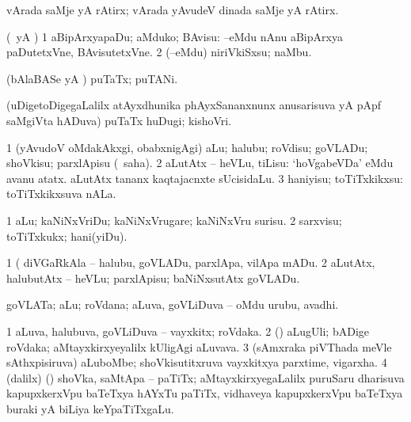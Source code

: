 \bentry
{} 
\gl{\nA}
\expl{}
\bmng
vArada saMje yA rAtirx; vArada yAvudeV dinada saMje yA rAtirx. 
\emng
\eentry

\bentry
{} 
\gl{\akirx}
\expl{}
\bmng
(\pArxparx\ yA \kAparx) 
\bnum
\num{1} aBipArxyapaDu; aMduko; BAvisu:  --eMdu nAnu aBipArxya paDutetxVne, BAvisutetxVne. 
\num{2} (--eMdu) niriVkiSxsu; naMbu. 
\enum
\emng
\eentry

\bentry
{} 
\gl{\gu}
\bmng
(bAlaBASe yA \AmA) puTaTx; puTANi. 
\emng
\eentry

\bentry
{} 
\gl{\nA}
\expl{}
\bmng
(uDigetoDigegaLalilx atAyxdhunika phAyxSananxnunx anusarisuva yA pApf saMgiVta hADuva) puTaTx huDugi; kishoVri. 
\emng
\eentry

\bentry
{} 
\gl{\sakirx}
\expl{}
\bmng
\bnum
\num{1} (yAvudoV oMdakAkxgi, obabxnigAgi) aLu; halubu; roVdisu; goVLADu; shoVkisu; parxlApisu (\akirx\ saha). 
\num{2} aLutAtx -- heVLu, tiLisu:  `hoVgabeVDa' eMdu avanu atatx.  aLutAtx tananx kaqtajacnxte sUcisidaLu. 
\num{3} haniyisu; toTiTxkikxsu:  toTiTxkikxsuva nALa. 
\enum
\emng

\noindent 
\gl{\akirx}
\expl{}
\bmng
\bnum
\num{1} aLu; kaNiNxVriDu; kaNiNxVrugare; kaNiNxVru surisu. 
\num{2} sarxvisu; toTiTxkukx; hani(yiDu). 
\enum
\emng

\noindent 
\gl{\pagu}
\expl{}
\bmng
\bnum
\num{1}  (  diVGaRkAla -- halubu, goVLADu, parxlApa, vilApa mADu. 
\num{2}  aLutAtx, halubutAtx -- heVLu; parxlApisu; baNiNxsutAtx goVLADu. 
\enum
\emng
\eentry

\bentry
{} 
\gl{\nA}
\expl{}
\bmng
goVLATa; aLu; roVdana; aLuva, goVLiDuva -- oMdu urubu, avadhi. 
\emng
\eentry

\bentry
{} 
\gl{\nA}
\expl{}
\bmng
\bnum
\num{1} aLuva, halubuva, goVLiDuva -- vayxkitx; roVdaka. 
\num{2} (\ca) aLugUli; bADige roVdaka; aMtayxkirxyeyalilx kUligAgi aLuvava. 
\num{3} (sAmxraka piVThada meVle sAthxpisiruva) aLuboMbe; shoVkisutitxruva vayxkitxya parxtime, vigarxha. 
\num{4} (\bava dalilx) (\ca) shoVka, saMtApa -- paTiTx; aMtayxkirxyegaLalilx puruSaru dharisuva kapupxkerxVpu baTeTxya hAYxTu paTiTx, vidhaveya kapupxkerxVpu baTeTxya buraki yA biLiya keYpaTiTxgaLu. 
\enum
\emng
\eentry

